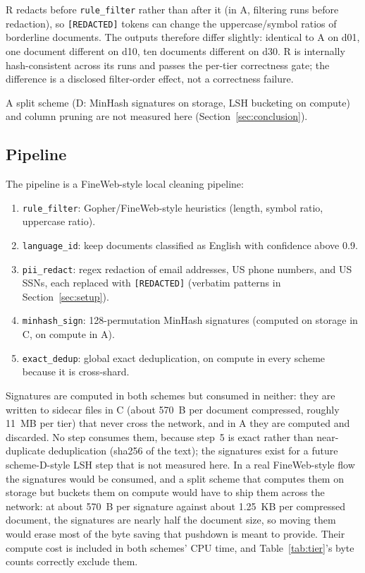\documentclass[11pt]{article}
\begin{document}
R redacts before \texttt{rule\_filter} rather than after it (in A, filtering runs before redaction), so \texttt{[REDACTED]} tokens can change the uppercase/symbol ratios of borderline documents. The outputs therefore differ slightly: identical to A on d01, one document different on d10, ten documents different on d30. R is internally hash-consistent across its runs and passes the per-tier correctness gate; the difference is a disclosed filter-order effect, not a correctness failure.

A split scheme (D: MinHash signatures on storage, LSH bucketing on compute) and column pruning are not measured here (Section~\ref{sec:conclusion}).

\subsection{Pipeline}

The pipeline is a FineWeb-style local cleaning pipeline:
\begin{enumerate}
\item \texttt{rule\_filter}: Gopher/FineWeb-style heuristics (length, symbol ratio, uppercase ratio).
\item \texttt{language\_id}: keep documents classified as English with confidence above 0.9.
\item \texttt{pii\_redact}: regex redaction of email addresses, US phone numbers, and US SSNs, each replaced with \texttt{[REDACTED]} (verbatim patterns in Section~\ref{sec:setup}).
\item \texttt{minhash\_sign}: 128-permutation MinHash signatures (computed on storage in C, on compute in A).
\item \texttt{exact\_dedup}: global exact deduplication, on compute in every scheme because it is cross-shard.
\end{enumerate}

Signatures are computed in both schemes but consumed in neither: they are written to sidecar files in C (about 570~B per document compressed, roughly 11~MB per tier) that never cross the network, and in A they are computed and discarded. No step consumes them, because step~5 is exact rather than near-duplicate deduplication (sha256 of the text); the signatures exist for a future scheme-D-style LSH step that is not measured here. In a real FineWeb-style flow the signatures would be consumed, and a split scheme that computes them on storage but buckets them on compute would have to ship them across the network: at about 570~B per signature against about 1.25~KB per compressed document, the signatures are nearly half the document size, so moving them would erase most of the byte saving that pushdown is meant to provide. Their compute cost is included in both schemes' CPU time, and Table~\ref{tab:tier}'s byte counts correctly exclude them.
\end{document}
